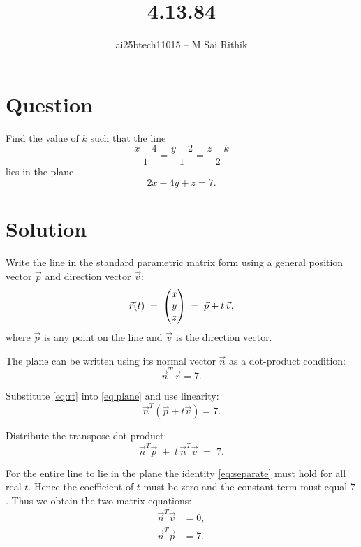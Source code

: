 \documentclass[12pt]{article}
\title{4.13.84}
\author{ai25btech11015 -- M Sai Rithik}
\date{}
\begin{document}
\maketitle

\section*{Question}
Find the value of \(k\) such that the line
\[
\frac{x-4}{1}=\frac{y-2}{1}=\frac{z-k}{2}
\]
lies in the plane
\[
2x-4y+z=7.
\]

\section*{Solution}

Write the line in the standard parametric matrix form using a general position vector $\Vec{p}$ and direction vector $\Vec{v}$:
\begin{equation}
\Vec{r}(t) \;=\; \begin{pmatrix}x\\y\\z\end{pmatrix} \;=\; \Vec{p} + t\,\Vec{v},
\label{eq:rt}
\end{equation}
where $\Vec{p}$ is any point on the line and $\Vec{v}$ is the direction vector.

The plane can be written using its normal vector $\Vec{n}$ as a dot-product condition:
\begin{equation}
\Vec{n}^{T}\,\Vec{r} = 7.
\label{eq:plane}
\end{equation}

Substitute \eqref{eq:rt} into \eqref{eq:plane} and use linearity:
\begin{equation}
\Vec{n}^{T}(\Vec{p} + t\Vec{v}) = 7.
\label{eq:lin}
\end{equation}

Distribute the transpose-dot product:
\begin{equation}
\Vec{n}^{T}\Vec{p} \;+\; t\,\Vec{n}^{T}\Vec{v} \;=\; 7.
\label{eq:separate}
\end{equation}

For the entire line to lie in the plane the identity \eqref{eq:separate} must hold for all real \(t\).  
Hence the coefficient of \(t\) must be zero and the constant term must equal \(7\).  Thus we obtain the two matrix equations:
\begin{align}
\Vec{n}^{T}\Vec{v} &= 0, \label{eq:tvanish} \\
\Vec{n}^{T}\Vec{p} &= 7. \label{eq:constcond}
\end{align}
\end{document}
